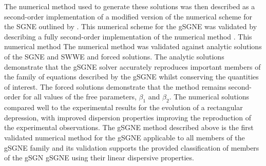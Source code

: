 \documentclass[10pt]{elsarticle}
\providecommand{\DIFaddtex}[1]{{\protect\color{blue} \sf #1}} %
\providecommand{\DIFdeltex}[1]{{\protect\color{red} \scriptsize #1}} %
\providecommand{\DIFaddbegin}{} %
\providecommand{\DIFaddend}{} %
\providecommand{\DIFdelbegin}{} %
\providecommand{\DIFdelend}{} %
\providecommand{\DIFadd}[1]{\texorpdfstring{\DIFaddtex{#1}}{#1}} %
\providecommand{\DIFdel}[1]{\texorpdfstring{\DIFdeltex{#1}}{}} %
\newcommand{\DIFscaledelfig}{0.5}
\newlength{\DIFdelgraphicswidth} %
\newlength{\DIFdelgraphicsheight} %
\newcommand{\DIFaddincludegraphics}[2][]{{\color{blue}\fbox{\DIFOincludegraphics[#1]{#2}}}} %
\newcommand{\DIFdelincludegraphics}[2][]{%
\sbox{\DIFdelgraphicsbox}{\DIFOincludegraphics[#1]{#2}}%
\settoboxwidth{\DIFdelgraphicswidth}{\DIFdelgraphicsbox} %
\settoboxtotalheight{\DIFdelgraphicsheight}{\DIFdelgraphicsbox} %
\scalebox{\DIFscaledelfig}{%
\parbox[b]{\DIFdelgraphicswidth}{\usebox{\DIFdelgraphicsbox}\\[-\baselineskip] \rule{\DIFdelgraphicswidth}{0em}}\llap{\resizebox{\DIFdelgraphicswidth}{\DIFdelgraphicsheight}{%
\setlength{\unitlength}{\DIFdelgraphicswidth}%
\begin{picture}(1,1)%
\thicklines\linethickness{2pt} %
{\color[rgb]{1,0,0}\put(0,0){\framebox(1,1){}}}%
{\color[rgb]{1,0,0}\put(0,0){\line( 1,1){1}}}%
{\color[rgb]{1,0,0}\put(0,1){\line(1,-1){1}}}%
\end{picture}%
}\hspace*{3pt}}} %
} %
\DeclareRobustCommand{\DIFaddbegin}{\DIFOaddbegin \let\includegraphics\DIFaddincludegraphics} %
\DeclareRobustCommand{\DIFaddend}{\DIFOaddend \let\includegraphics\DIFOincludegraphics} %
\DeclareRobustCommand{\DIFdelbegin}{\DIFOdelbegin \let\includegraphics\DIFdelincludegraphics} %
\DeclareRobustCommand{\DIFdelend}{\DIFOaddend \let\includegraphics\DIFOincludegraphics} %
\begin{document}
The numerical method used to generate these solutions was then described as a \DIFaddbegin \DIFadd{second-order implementation of a }\DIFaddend modified version of the numerical scheme for the SGNE outlined by \citet{Zoppou-etal-2017}. \DIFdelbegin \DIFdel{This numerical scheme for the gSGNE was validated by describing a fully second-order implementation of the numerical method . This numerical method }\DIFdelend \DIFaddbegin \DIFadd{The numerical method }\DIFaddend was validated against analytic solutions of the SGNE and SWWE and forced solutions. The analytic solutions demonstrate that the gSGNE solver accurately reproduces important members of the family of equations described by the gSGNE whilst conserving the quantities of interest. The forced solutions demonstrate that the method remains second-order for all values of the free parameters, $\beta_1$ and $\beta_2$. The numerical solutions compared well to the experimental results for the evolution of a rectangular depression, with improved dispersion properties improving the reproduction of the experimental observations. The gSGNE method described above is the first validated numerical method \DIFdelbegin \DIFdel{for the gSGNE }\DIFdelend \DIFaddbegin \DIFadd{applicable to all members of the gSGNE family }\DIFaddend and its validation supports the provided classification of members of the \DIFdelbegin \DIFdel{gSGN }\DIFdelend \DIFaddbegin \DIFadd{gSGNE }\DIFaddend using their linear dispersive properties.


 

\end{document}
